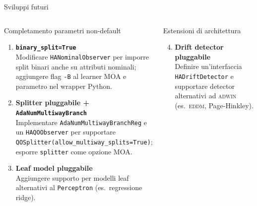 \documentclass[aspectratio=169,10pt]{beamer}
\newcommand{\adwin}{\textsc{adwin}}
\begin{document}
\begin{frame}{Sviluppi futuri}
  \begin{columns}[T]
    \begin{block}{Completamento parametri non-default}
      \begin{enumerate}\small
        \item \textbf{\texttt{binary\_split=True}} \\
              \footnotesize Modificare \texttt{HANominalObserver}
              per imporre split binari anche su attributi nominali;
              aggiungere flag \texttt{-B} al learner MOA e
              parametro nel wrapper Python.

        \medskip
        \item \textbf{Splitter pluggabile + \texttt{AdaNumMultiwayBranch}} \\
              \footnotesize Implementare \texttt{AdaNumMultiwayBranchReg}
              e un \texttt{HAQOObserver} per supportare
              \texttt{QOSplitter(allow\_multiway\_splits=True)};
              esporre \texttt{splitter} come opzione MOA.

        \medskip
        \item \textbf{Leaf model pluggabile} \\
              \footnotesize Aggiungere supporto per modelli leaf
              alternativi al \texttt{Perceptron}
              (es.\ regressione ridge).
      \end{enumerate}
    \end{block}

    \begin{block}{Estensioni di architettura}
      \begin{enumerate}\setcounter{enumi}{3}\small
        \item \textbf{Drift detector pluggabile} \\
              \footnotesize Definire un'interfaccia
              \texttt{HADriftDetector} e supportare detector
              alternativi ad \adwin{}
              (es.\ \textsc{eddm}, Page-Hinkley).
      \end{enumerate}
    \end{block}
  \end{columns}
\end{frame}
\end{document}
